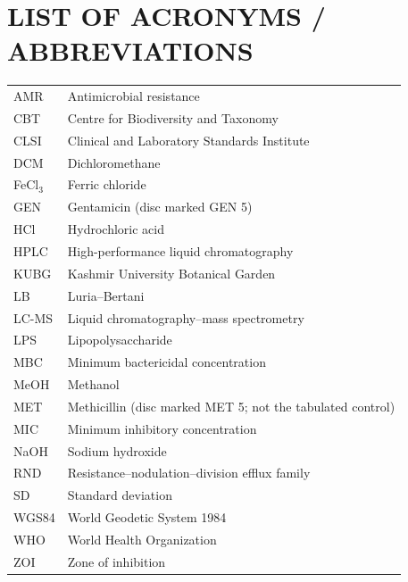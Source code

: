 
\clearpage
\chapter*{LIST OF ACRONYMS / ABBREVIATIONS}
\thispagestyle{frontmatterstyle}

\noindent
\begin{tabular}{@{}p{}p{}@{}}
AMR      & Antimicrobial resistance \\[0.35em]
CBT      & Centre for Biodiversity and Taxonomy \\[0.35em]
CLSI     & Clinical and Laboratory Standards Institute \\[0.35em]
DCM      & Dichloromethane \\[0.35em]
FeCl$_3$ & Ferric chloride \\[0.35em]
GEN      & Gentamicin (disc marked GEN 5) \\[0.35em]
HCl      & Hydrochloric acid \\[0.35em]
HPLC     & High-performance liquid chromatography \\[0.35em]
KUBG     & Kashmir University Botanical Garden \\[0.35em]
LB       & Luria--Bertani \\[0.35em]
LC-MS    & Liquid chromatography--mass spectrometry \\[0.35em]
LPS      & Lipopolysaccharide \\[0.35em]
MBC      & Minimum bactericidal concentration \\[0.35em]
MeOH     & Methanol \\[0.35em]
MET      & Methicillin (disc marked MET 5; not the tabulated control) \\[0.35em]
MIC      & Minimum inhibitory concentration \\[0.35em]
NaOH     & Sodium hydroxide \\[0.35em]
RND      & Resistance--nodulation--division efflux family \\[0.35em]
SD       & Standard deviation \\[0.35em]
WGS84    & World Geodetic System 1984 \\[0.35em]
WHO      & World Health Organization \\[0.35em]
ZOI      & Zone of inhibition \\
\end{tabular}
